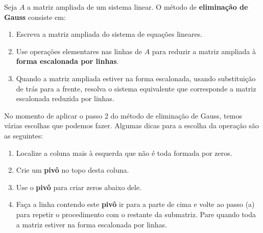 \begin{definicao}
    Seja $A$ a matriz ampliada de um sistema linear. O método de \textbf{eliminação de Gauss} consiste em:
    \begin{enumerate}[label={\roman*})]
        \item Escreva a matriz ampliada do sistema de equações lineares.

        \item Use operações elementares nas linhas de $A$ para reduzir a matriz ampliada à \textbf{forma escalonada por linhas}.

        \item Quando a matriz ampliada estiver na forma escalonada, usando substituição de trás para a frente, resolva o sistema equivalente que corresponde a matriz escalonada reduzida por linhas.
    \end{enumerate}
\end{definicao}

\begin{observacao}
    No momento de aplicar o passo 2 do método de eliminação de Gauss, temos várias escolhas que podemos fazer. Algumas dicas para a escolha da operação são as seguintes:
    \begin{enumerate}[label=({\alph*})]
        \item Localize a coluna mais à esquerda que não é toda formada por zeros.

        \item Crie um \textbf{pivô} no topo desta coluna.

        \item Use o \textbf{pivô} para criar zeros abaixo dele.

        \item Faça a linha contendo este \textbf{pivô} ir para a parte de cima e volte ao passo (a) para repetir o procedimento com o restante da submatriz. Pare quando toda a matriz estiver na forma escalonada por linhas.
    \end{enumerate}
\end{observacao}

